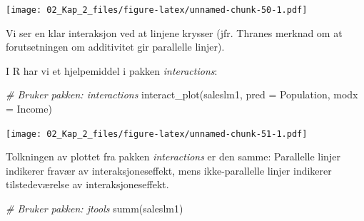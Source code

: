 \documentclass[
]{article}
\newenvironment{Shaded}{\begin{snugshade}}{\end{snugshade}}
\newcommand{\AttributeTok}[1]{\textcolor[rgb]{0.77,0.63,0.00}{#1}}
\newcommand{\CommentTok}[1]{\textcolor[rgb]{0.56,0.35,0.01}{\textit{#1}}}
\newcommand{\FunctionTok}[1]{\textcolor[rgb]{0.00,0.00,0.00}{#1}}
\newcommand{\NormalTok}[1]{#1}
\begin{document}
\texttt{[image: 02\_Kap\_2\_files/figure-latex/unnamed-chunk-50-1.pdf]}

Vi ser en klar interaksjon ved at linjene krysser (jfr. Thranes merknad om at forutsetningen om additivitet gir parallelle linjer).

I R har vi et hjelpemiddel i pakken \emph{interactions}:

\begin{Shaded}
\begin{Highlighting}[]
\CommentTok{\# Bruker pakken: interactions}
\FunctionTok{interact\_plot}\NormalTok{(saleslm1, }\AttributeTok{pred =}\NormalTok{ Population, }\AttributeTok{modx =}\NormalTok{ Income)}
\end{Highlighting}
\end{Shaded}

\texttt{[image: 02\_Kap\_2\_files/figure-latex/unnamed-chunk-51-1.pdf]}

Tolkningen av plottet fra pakken \emph{interactions} er den samme: Parallelle linjer indikerer fravær av interaksjoneseffekt, mens ikke-parallelle linjer indikerer tilstedeværelse av interaksjoneseffekt.

\begin{Shaded}
\begin{Highlighting}[]
\CommentTok{\# Bruker pakken: jtools}
\FunctionTok{summ}\NormalTok{(saleslm1)}
\end{Highlighting}
\end{Shaded}
\end{document}
